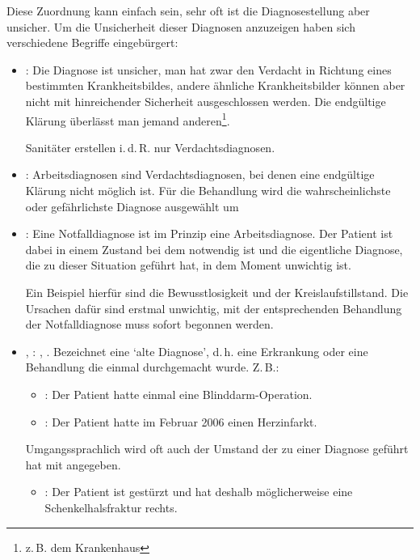 
{Diese Zuordnung kann einfach sein, sehr oft ist die Diagnosestellung
aber unsicher. Um die Unsicherheit dieser Diagnosen
anzuzeigen haben sich verschiedene Begriffe eingebürgert: 

\begin{itemize}
    \item {}: 
    Die Diagnose ist unsicher, man hat zwar den Verdacht in
    Richtung  eines bestimmten Krankheitsbildes, andere
    ähnliche Krankheitsbilder können  aber nicht mit
    hinreichender Sicherheit ausgeschlossen werden. Die
    endgültige Klärung überlässt man jemand
    anderen\footnote{z.\,B. dem Krankenhaus}. \par Sanitäter
    erstellen i.\,d.\,R. nur Verdachtsdiagnosen.
     
    \item {}: 
    Arbeitsdiagnosen sind Verdachtsdiagnosen, bei denen eine
    endgültige Klärung nicht  möglich ist. Für die
    Behandlung wird die wahrscheinlichste oder gefährlichste
    Diagnose ausgewählt um 
    \item {}: Eine
    Notfalldiagnose ist im Prinzip eine Arbeitsdiagnose. Der Patient ist dabei 
    in einem Zustand bei dem  notwendig ist und die 
    eigentliche Diagnose, die zu dieser Situation geführt hat, in dem Moment 
    unwichtig ist. 
    \par Ein Beispiel hierfür sind die Bewusstlosigkeit und der
    Kreislaufstillstand. Die Ursachen dafür sind erstmal unwichtig, mit der
    entsprechenden Behandlung der Notfalldiagnose muss sofort begonnen werden.
    \item {},  :
     
    , . Bezeichnet eine
    \enquote*{alte Diagnose}, d.\,h. eine Erkrankung oder eine Behandlung
    die einmal durchgemacht wurde. Z.\,B.:
    \begin{itemize}
        \item {}: Der Patient
        hatte einmal eine Blinddarm-Operation.
        \item {}: Der Patient
        hatte im Februar 2006 einen Herzinfarkt.
    \end{itemize}
    Umgangssprachlich wird oft auch der Umstand der zu einer
    Diagnose geführt hat mit 
    angegeben.
    \begin{itemize}
        \item {}: Der
        Patient ist gestürzt und hat deshalb möglicherweise eine
        Schenkelhalsfraktur rechts.
    \end{itemize}
\end{itemize}}
